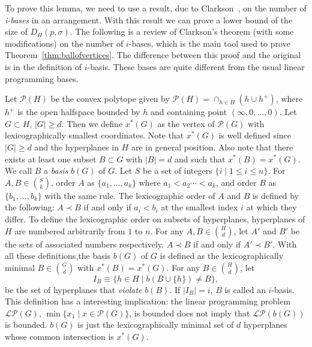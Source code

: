\documentclass{patmorin}
\begin{document}
To prove this lemma, we need to use a result, due to Clarkson~\cite{Clarkson93}, on the number of \emph{i-bases} in an arrangement. With this result we can prove a lower bound of the size of $D_{H}(p,\sigma)$. The following is a review of Clarkson's theorem (with some modifications) on the number of $i$-bases, which is the main tool used to prove Theorem~\ref{thm:ballofvertices}. The difference between this proof and the original is in the definition of $i$-basis. These bases are quite different from the usual linear programming bases.

Let $\mathcal{P}(H)$ be the convex polytope given by $\mathcal{P}(H) = \cap_{h \in H}(h \cup h^{+})$, where $h^{+}$ is the open halfspace bounded by $h$ and containing point $(\infty, 0, \ldots, 0)$. Let $G \subset H$, $|G| \geq d$. Then we define $x^{*}(G)$ as the vertex of $\mathcal{P}(G)$ with lexicographically smallest coordinates. Note that $x^{*}(G)$ is well defined since $|G| \geq d$ and the hyperplanes in $H$ are in general position. Also note that there exists at least one subset $B \subset G$ with $|B| = d$ and such that $x^{*}(B) = x^{*}(G)$. We call $B$ a \emph{basis} $b(G)$ of $G$. Let $S$ be a set of integers $\{i \mid 1 \leq i \leq n\}$. For $A, B \in \binom{S}{k}$, order $A$ as $\{a_{1}, \ldots, a_{k}\}$ where $a_{1} < a_{2} \cdots < a_{k}$, and order $B$ as $\{b_{1}, \ldots, b_{k}\}$ with the same rule. The lexicographic order of $A$ and $B$ is defined by the following: $A \prec B$ if and only if $a_{i} < b_{i}$ at the smallest index $i$ at which they differ. To define the lexicographic order on subsets of hyperplanes, hyperplanes of $H$ are numbered arbitrarily from $1$ to $n$. For any $A, B \in \binom{H}{d}$, let $A'$ and $B'$ be the sets of associated numbers respectively. $A \prec B$ if and only if $A' \prec B'$. With all these definitions,the basis $b(G)$ of $G$ is defined as the lexicographically minimal $B \in \binom{G}{d}$ with $x^{*}(B) = x^{*}(G)$. For any $B \in \binom{H}{d}$, let
 \[I_{B} \equiv \{h \in H \mid b(B \cup \{h\}) \neq B\} ,\]
be the set of hyperplanes that \emph{violate} $b(B)$. If $|I_{B}| = i$, $B$ is called an $i$-basis. This definition has a interesting implication: the linear programming problem $\mathcal{LP}(G)$, $\min\{x_{1} \mid x \in \mathcal{P}(G)\}$, is bounded does not imply that $\mathcal{LP}(b(G))$ is bounded. $b(G)$ is just the lexicographically minimal set of $d$ hyperplanes whose common intersection is $x^{*}(G)$.
\end{document}
